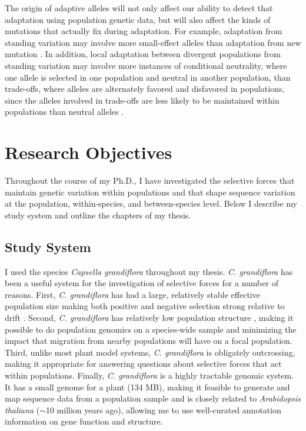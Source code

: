 The origin of adaptive alleles will not only affect our ability to detect that adaptation using population genetic data, but will also affect the kinds of mutations that actually fix during adaptation. For example, adaptation from standing variation may involve more small-effect alleles than adaptation from new mutation \citep{Orr2001-fq}. In addition, local adaptation between divergent populations from standing variation may involve more instances of conditional neutrality, where one allele is selected in one population and neutral in another population, than trade-offs, where alleles are alternately favored and disfavored in populations, since the alleles involved in trade-offs are less likely to be maintained within populations than neutral alleles \citep{Anderson2011-hs}. 

\section{Research Objectives}

Throughout the course of my Ph.D., I have investigated the selective forces that maintain genetic variation within populations and that shape sequence variation at the population, within-species, and between-species level. Below I describe my study system and outline the chapters of my thesis.

\subsection{Study System}
I used the species \textit{Capsella grandiflora} throughout my thesis. \textit{C. grandiflora} has been a useful system for the investigation of selective forces for a number of reasons. First, \textit{C. grandiflora} has had a large, relatively stable effective population size making both positive and negative selection strong relative to drift \citep{Slotte2010-gw}. Second, \textit{C. grandiflora} has relatively low population structure \citep{St_onge2011-jz}, making it possible to do population genomics on a species-wide sample and minimizing the impact that migration from nearby populations will have on a focal population. Third, unlike most plant model systems, \textit{C. grandiflora} is obligately outcrossing, making it appropriate for answering questions about selective forces that act within populations. Finally, \textit{C. grandiflora} is a highly tractable genomic system. It has a small genome for a plant (134 MB), making it feasible to generate and map sequence data from a population sample and is closely related to \textit{Arabidopsis thaliana} ($\sim$10 million years ago), allowing me to use well-curated annotation information on gene function and structure.

